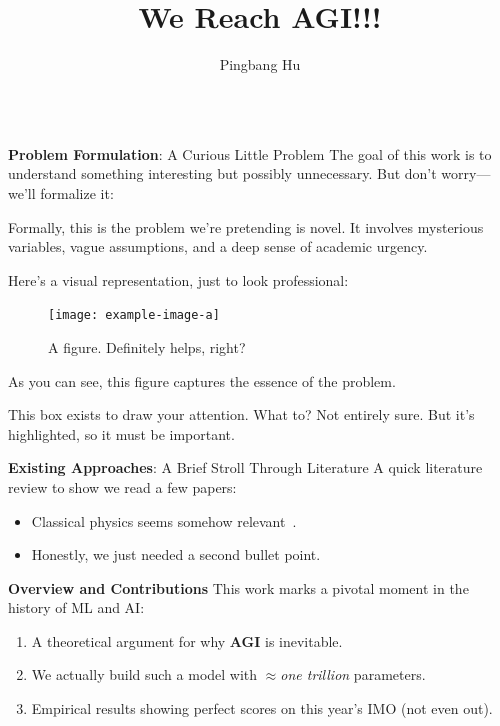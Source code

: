 \documentclass[final,dvipsnames]{beamer}
\title{We Reach AGI!!!}
\author{Pingbang Hu} %
\institute{University of Illinois Urbana-Champaign}
\begin{document}
\begin{frame}[t]
	\begin{columns}[t]

		\begin{column}{\colwidth}

			\begin{block}{\textbf{Problem Formulation}: A Curious Little Problem}
				The goal of this work is to understand something interesting but possibly unnecessary. But don't worry---we'll formalize it:

				\begin{definition}
					Formally, this is the problem we're pretending is novel. It involves mysterious variables, vague assumptions, and a deep sense of academic urgency.
				\end{definition}

				Here's a visual representation, just to look professional:

				\begin{figure}[H]
					\centering
					\texttt{[image: example-image-a]}
					\caption{A figure. Definitely helps, right?}
				\end{figure}

				As you can see, this figure captures the essence of the problem.

				\begin{highlight}
					This box exists to draw your attention. What to? Not entirely sure. But it's highlighted, so it must be important.
				\end{highlight}

			\end{block}

			\begin{block}{\textbf{Existing Approaches}: A Brief Stroll Through Literature}
				A quick literature review to show we read a few papers:

				\begin{itemize}
					\item Classical physics seems somehow relevant~\cite{newton1726philosophiae}.
					\item Honestly, we just needed a second bullet point.
				\end{itemize}
			\end{block}

			\begin{block}{\textbf{Overview and Contributions}}
				This work marks a pivotal moment in the history of ML and AI:
				\begin{enumerate}
					\item A theoretical argument for why {\color{RedOrange}\textbf{AGI}} is inevitable.
					\item We actually build such a model with \(\approx \)\emph{one trillion} parameters.
					\item Empirical results showing perfect scores on this year's IMO (not even out).
				\end{enumerate}
			\end{block}


\end{column}
\end{columns}
\end{frame}
\end{document}

